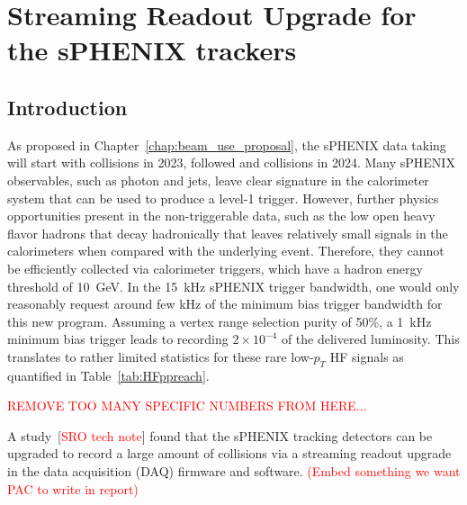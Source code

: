 
\section{Streaming Readout Upgrade for the sPHENIX trackers}
 
\subsection{Introduction}

As proposed in Chapter~\ref{chap:beam_use_proposal}, the sPHENIX data taking will start with \auau collisions in 2023, followed \pp and \pau collisions in 2024. Many sPHENIX observables, such as photon and jets, leave clear signature in the calorimeter system that can be used to produce a level-1 trigger. However, further physics opportunities present in the non-triggerable data, such as the low \pt open heavy flavor hadrons that decay hadronically that leaves  relatively small signals in the
calorimeters when compared with the underlying event. Therefore, they
cannot be efficiently collected via calorimeter triggers, which have a
hadron energy threshold of 10~GeV. In the 15~kHz sPHENIX trigger
bandwidth, one would only reasonably request around few kHz of the
minimum bias \pp trigger bandwidth for this new program. Assuming a
vertex range selection purity of 50\%, a 1~kHz minimum bias trigger
leads to recording $2\times10^{-4}$ of the delivered luminosity. This
translates to rather limited statistics for these rare low-$p_T$ HF
signals as quantified in Table~\ref{tab:HFppreach}.

{\textcolor{red}{REMOVE TOO MANY SPECIFIC NUMBERS FROM HERE...}}

 
A study~[{\textcolor{red}{SRO tech note}}] found that the sPHENIX tracking detectors can
be upgraded to record a large amount of \pp collisions via a streaming
readout upgrade in the data acquisition (DAQ) firmware and software.
{\textcolor{red}{(Embed something we want PAC to write in report)}} 



